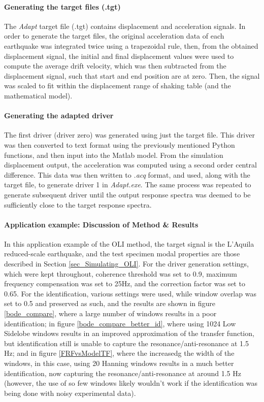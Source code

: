 \documentclass[  10pt, twoside]{report} %
\numberwithin{equation}{chapter}
\begin{document}
\paragraph{Generating the target files (.tgt)}
The \emph{Adapt} target file (.tgt) contains displacement and acceleration signals. In order to generate the target files, the original acceleration data of each earthquake was integrated twice using a trapezoidal rule, then, from the obtained displacement signal, the initial and final displacement values were used to compute the average drift velocity, which was then subtracted from the displacement signal, such that start and end position are at zero. Then, the signal was scaled to fit within the displacement range of shaking table (and the mathematical model).

\paragraph{Generating the adapted driver}
The first driver (driver zero) was generated using just the target file. This driver was then converted to text format using the previously mentioned Python functions, and then input into the Matlab model. From the simulation displacement output, the acceleration was computed using a second order central difference. This data was then written to \emph{.acq} format, and used, along with the target file, to generate driver 1  in \emph{Adapt.exe}. The same process was repeated to generate subsequent driver until the output response spectra was deemed to be sufficiently close to the target response spectra.

\paragraph{Application example: Discussion of Method \& Results} \label{sec_OLI_Application_example}
In this application example of the OLI method, the target signal is the L'Aquila reduced-scale earthquake, and the test specimen modal properties are those described in Section \ref{sec_Simulating_OLI}. For the driver generation settings, which were kept throughout, coherence threshold was set to 0.9, maximum frequency compensation was set to 25Hz, and the correction factor was set to 0.65. For the identification, various settings were used, while window overlap was set to 0.5 and preserved as such, and the results are shown in figure \ref{bode_compare}, where a large number of windows results in a poor identification; in figure \ref{bode_compare_better_id}, where using 1024 Low Sidelobe windows results in an improved approximation of the transfer function, but identification still is unable to capture the resonance/anti-resonance at 1.5 Hz; and in figure \ref{FRFvsModelTF}, where the increasedg the width of the windows, in this case, using 20 Hanning windows results in a much better identification, now capturing the resonance/anti-resonance at around 1.5 Hz (however, the use of so few windows likely wouldn't work if the identification was being done with noisy experimental data).
\end{document}
